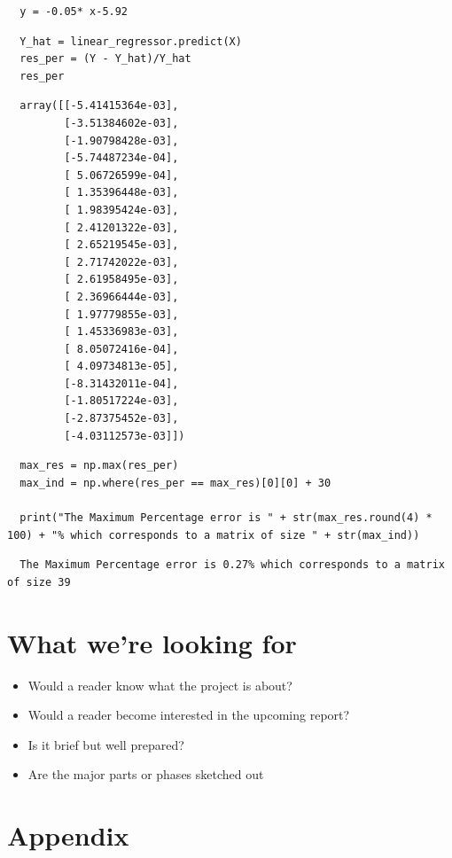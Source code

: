 \documentclass[11pt]{article}
\begin{document}
\begin{verbatim}
  y = -0.05* x-5.92
\end{verbatim}

\begin{verbatim}
  Y_hat = linear_regressor.predict(X)
  res_per = (Y - Y_hat)/Y_hat
  res_per
\end{verbatim}

\begin{verbatim}
  array([[-5.41415364e-03],
         [-3.51384602e-03],
         [-1.90798428e-03],
         [-5.74487234e-04],
         [ 5.06726599e-04],
         [ 1.35396448e-03],
         [ 1.98395424e-03],
         [ 2.41201322e-03],
         [ 2.65219545e-03],
         [ 2.71742022e-03],
         [ 2.61958495e-03],
         [ 2.36966444e-03],
         [ 1.97779855e-03],
         [ 1.45336983e-03],
         [ 8.05072416e-04],
         [ 4.09734813e-05],
         [-8.31432011e-04],
         [-1.80517224e-03],
         [-2.87375452e-03],
         [-4.03112573e-03]])
\end{verbatim}

\begin{verbatim}
  max_res = np.max(res_per)
  max_ind = np.where(res_per == max_res)[0][0] + 30

  print("The Maximum Percentage error is " + str(max_res.round(4) * 100) + "% which corresponds to a matrix of size " + str(max_ind))
\end{verbatim}

\begin{verbatim}
  The Maximum Percentage error is 0.27% which corresponds to a matrix of size 39
\end{verbatim}
\section{What we're looking for}
\label{sec:orge324418}

\begin{itemize}
\item Would a reader know what the project is about?
\item Would a reader become interested in the upcoming report?
\item Is it brief but well prepared?
\item Are the major parts or phases sketched out
\end{itemize}


\section{Appendix}
\label{sec:org7faa82a}
\end{document}
